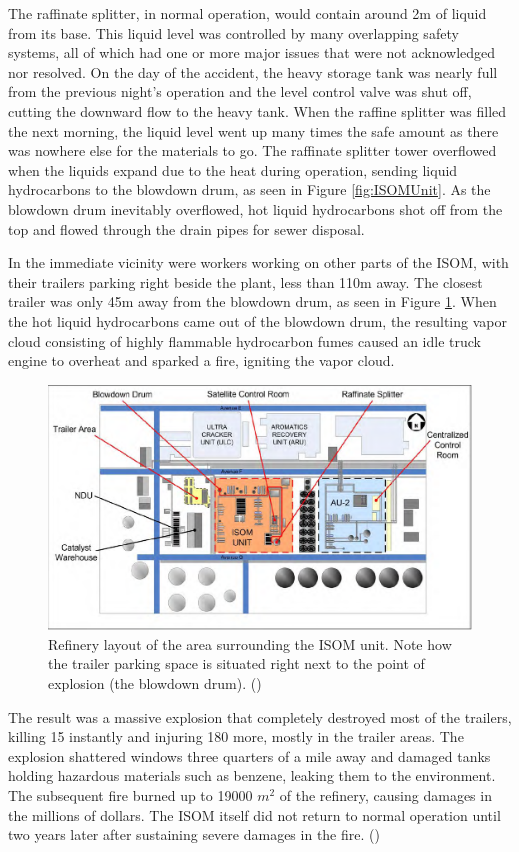 \documentclass[12pt]{article}
\begin{document}
	The raffinate splitter, in normal operation, would contain around 2m of liquid from its base. This liquid level was controlled by many overlapping safety systems, all of which had one or more major issues that were not acknowledged nor resolved. On the day of the accident, the heavy storage tank was nearly full from the previous night's operation and the level control valve was shut off, cutting the downward flow to the heavy tank. When the raffine splitter was filled the next morning, the liquid level went up many times the safe amount as there was nowhere else for the materials to go. The raffinate splitter tower overflowed when the liquids expand due to the heat during operation, sending liquid hydrocarbons to the blowdown drum, as seen in Figure \ref{fig:ISOMUnit}. As the blowdown drum inevitably overflowed, hot liquid hydrocarbons shot off from the top and flowed through the drain pipes for sewer disposal.

	In the immediate vicinity were workers working on other parts of the ISOM, with their trailers parking right beside the plant, less than 110m away. The closest trailer was only 45m away from the blowdown drum, as seen in Figure \ref{fig:reflayout}. When the hot liquid hydrocarbons came out of the blowdown drum, the resulting vapor cloud consisting of highly flammable hydrocarbon fumes caused an idle truck engine to overheat and sparked a fire, igniting the vapor cloud. 
	
	\begin{figure}[H]
		\includegraphics[width=\textwidth]{Refinery_layout.png}
		\caption{Refinery layout of the area surrounding the ISOM unit. Note how the trailer parking space is situated right next to the point of explosion (the blowdown drum). (\cite{csbreport})}
		\label{fig:reflayout}
	\end{figure}
	The result was a massive explosion that completely destroyed most of the trailers, killing 15 instantly and injuring 180 more, mostly in the trailer areas. The explosion shattered windows three quarters of a mile away and damaged tanks holding hazardous materials such as benzene, leaking them to the environment. The subsequent fire burned up to 19000 $m^2$ of the refinery, causing damages in the millions of dollars. The ISOM itself did not return to normal operation until two years later after sustaining severe damages in the fire. (\cite{csbreport})
	
\end{document}

